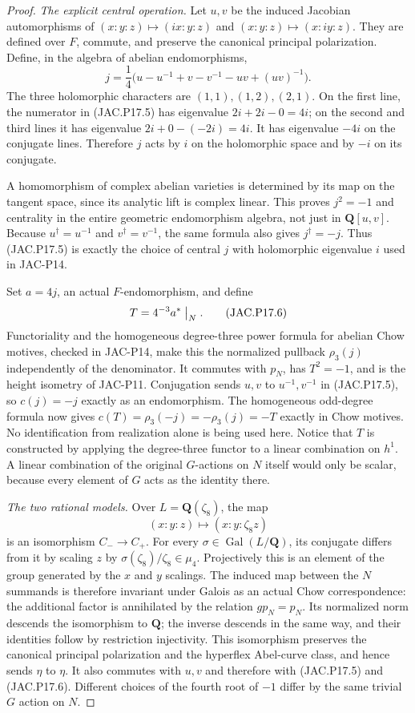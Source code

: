 \documentclass[11pt,a4paper]{article}
\begin{document}
\begin{proof}
\emph{The explicit central operation.}
Let $u,v$ be the induced Jacobian automorphisms of
$(x:y:z)\mapsto(ix:y:z)$ and $(x:y:z)\mapsto(x:iy:z)$.
They are defined over $F$, commute, and preserve the canonical
principal polarization. Define, in the algebra of abelian
endomorphisms,
\[
 j=\frac14\bigl(u-u^{-1}+v-v^{-1}-uv+(uv)^{-1}\bigr).
                                                               \tag{JAC.P17.5}
\]
The three holomorphic characters are $(1,1),(1,2),(2,1)$.
On the first line, the numerator in (JAC.P17.5) has eigenvalue
$2i+2i-0=4i$; on the second and third lines it has eigenvalue
$2i+0-(-2i)=4i$. It has eigenvalue $-4i$ on the conjugate
lines. Therefore $j$ acts by $i$ on the holomorphic space and
by $-i$ on its conjugate.

A homomorphism of complex abelian varieties is determined by
its map on the tangent space, since its analytic lift is complex
linear. This proves $j^2=-1$ and centrality in the entire
geometric endomorphism algebra, not just in $\mathbf Q[u,v]$.
Because $u^\dagger=u^{-1}$ and $v^\dagger=v^{-1}$, the same
formula also gives $j^\dagger=-j$. Thus (JAC.P17.5) is exactly
the choice of central $j$ with holomorphic eigenvalue $i$ used
in JAC-P14.

Set $a=4j$, an actual $F$-endomorphism, and define
\[
                  T=4^{-3}a^*\bigm|_N.                \tag{JAC.P17.6}
\]
Functoriality and the homogeneous degree-three power formula
for abelian Chow motives, checked in JAC-P14, make this the
normalized pullback $\rho_3(j)$ independently of the denominator.
It commutes with $p_N$, has $T^2=-1$, and is the height isometry
of JAC-P11. Conjugation sends $u,v$ to $u^{-1},v^{-1}$ in
(JAC.P17.5), so $c(j)=-j$ exactly as an endomorphism.
The homogeneous odd-degree formula now gives
$c(T)=\rho_3(-j)=-\rho_3(j)=-T$ exactly in Chow motives.
No identification from realization alone is being used here.
Notice that $T$ is constructed by applying the degree-three
functor to a linear combination on $h^1$. A linear combination
of the original $G$-actions on $N$ itself would only be scalar,
because every element of $G$ acts as the identity there.

\emph{The two rational models.}
Over $L=\mathbf Q(\zeta_8)$, the map
\[
             (x:y:z)\longmapsto(x:y:\zeta_8z)
                                                               \tag{JAC.P17.7}
\]
is an isomorphism $C_-\to C_+$. For every
$\sigma\in\operatorname{Gal}(L/\mathbf Q)$, its conjugate
differs from it by scaling $z$ by
$\sigma(\zeta_8)/\zeta_8\in\mu_4$. Projectively this is an
element of the group generated by the $x$ and $y$ scalings.
The induced map between the $N$ summands is therefore invariant
under Galois as an actual Chow correspondence: the additional
factor is annihilated by the relation $gp_N=p_N$.
Its normalized norm descends the isomorphism to $\mathbf Q$;
the inverse descends in the same way, and their identities follow
by restriction injectivity. This isomorphism preserves the
canonical principal polarization and the hyperflex Abel-curve
class, and hence sends $\eta$ to $\eta$. It also commutes with
$u,v$ and therefore with (JAC.P17.5) and (JAC.P17.6).
Different choices of the fourth root of $-1$ differ by the same
trivial $G$ action on $N$.


\end{proof}
\end{document}
